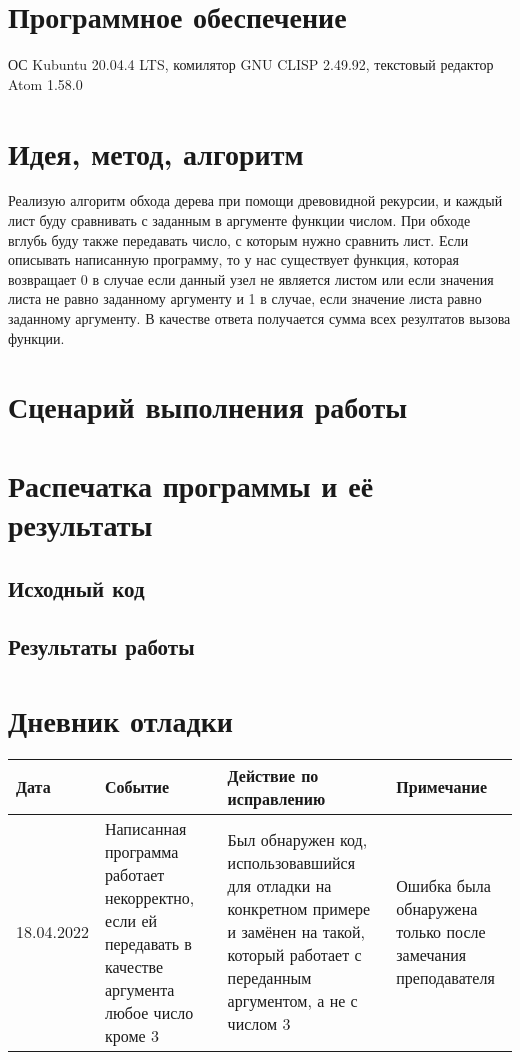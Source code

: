 \documentclass[12pt]{article}
\begin{document}
\section{Программное обеспечение}
ОС Kubuntu 20.04.4 LTS, комилятор GNU CLISP 2.49.92, текстовый редактор Atom 1.58.0

\pagebreak
\section{Идея, метод, алгоритм}
Реализую алгоритм обхода дерева при помощи древовидной рекурсии, и каждый лист буду сравнивать с заданным в аргументе функции числом.
При обходе вглубь буду также передавать число, с которым нужно сравнить лист. Если описывать написанную программу, то у нас
существует функция, которая возвращает 0 в случае если данный узел не является листом или если значения листа не равно заданному аргументу
и 1 в случае, если значение листа равно заданному аргументу. В качестве ответа получается сумма всех резултатов вызова функции.

\section{Сценарий выполнения работы}

\section{Распечатка программы и её результаты}

\subsection{Исходный код}


\pagebreak
\subsection{Результаты работы}


\pagebreak
\section{Дневник отладки}
\begin{tabular}{|p{50pt}|p{80pt}|p{140pt}|p{140pt}|}
\hline
Дата & Событие & Действие по исправлению & Примечание \\
\hline
18.04.2022 & Написанная программа работает некорректно, если ей передавать в качестве аргумента любое число кроме 3 &
Был обнаружен код, использовавшийся для отладки на конкретном примере и замёнен на такой, который работает с переданным аргументом,
а не с числом 3 & Ошибка была обнаружена только после замечания преподавателя \\
\hline
\end{tabular}
\end{document}
